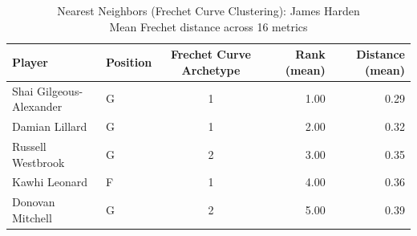 \begin{table}[t]
\caption*{
{\fontsize{20}{25} Nearest Neighbors (Frechet Curve Clustering): James Harden\fontsize{12}{15}\selectfont } \\ 
{\fontsize{14}{17}\selectfont  Mean Frechet distance across 16 metrics\fontsize{12}{15}\selectfont }
} 
\fontsize{12.0pt}{14.0pt}\selectfont
\begin{tabular*}{\linewidth}{@{\extracolsep{\fill}}llcrr}
\toprule
Player & Position & Frechet Curve Archetype & Rank (mean) & Distance (mean) \\ 
\midrule\addlinespace[2.5pt]
Shai Gilgeous-Alexander & G & 1 & 1.00 & 0.29 \\ 
Damian Lillard & G & 1 & 2.00 & 0.32 \\ 
Russell Westbrook & G & 2 & 3.00 & 0.35 \\ 
Kawhi Leonard & F & 1 & 4.00 & 0.36 \\ 
Donovan Mitchell & G & 2 & 5.00 & 0.39 \\ 
\bottomrule
\end{tabular*}
\end{table}


